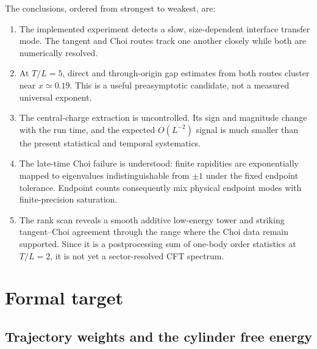 \documentclass[aps,prb,onecolumn,nofootinbib,superscriptaddress]{revtex4-2}
\begin{document}
The conclusions, ordered from strongest to weakest, are:
\begin{enumerate}
\item The implemented experiment detects a slow, size-dependent interface transfer mode.
The tangent and Choi routes track one another closely while both are numerically resolved.
\item At $T/L=5$, direct and through-origin gap estimates from both routes cluster near
$x\simeq0.19$.  This is a useful preasymptotic candidate, not a measured universal exponent.
\item The central-charge extraction is uncontrolled.  Its sign and magnitude change with
the run time, and the expected $O(L^{-2})$ signal is much smaller than the present statistical
and temporal systematics.
\item The late-time Choi failure is understood: finite rapidities are exponentially mapped
to eigenvalues indistinguishable from $\pm1$ under the fixed endpoint tolerance.  Endpoint
counts consequently mix physical endpoint modes with finite-precision saturation.
\item The rank scan reveals a smooth additive low-energy tower and striking tangent--Choi
agreement through the range where the Choi data remain supported.  Since it is a
postprocessing sum of one-body order statistics at $T/L=2$, it is not yet a sector-resolved
CFT spectrum.
\end{enumerate}

\section{Formal target}

\subsection{Trajectory weights and the cylinder free energy}
\end{document}
